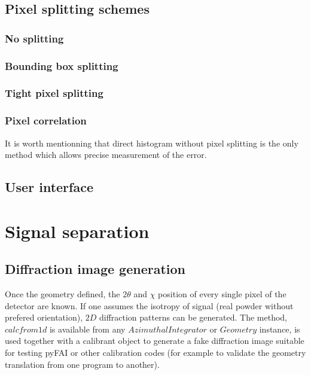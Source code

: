 \documentclass[preprint]{iucr}
\begin{document}
\subsection{Pixel splitting schemes}

\subsubsection{No splitting}

\subsubsection{Bounding box splitting}

\subsubsection{Tight pixel splitting}

\subsubsection{Pixel correlation}

It is worth mentionning that direct histogram without pixel splitting is the
only method which allows precise measurement of the error\cite{billinge2014}.

\subsection{User interface}

\section{Signal separation}

\subsection{Diffraction image generation}

Once the geometry defined, the $2\theta$ and $\chi$ position of every single
pixel of the detector are known.
If one assumes the isotropy of signal (real powder without prefered
orientation), $2D$ diffraction patterns can be generated.
The method, $calcfrom1d$ is available from any $Azimuthal Integrator$ or
$Geometry$ instance, is used together with a calibrant object
to generate a fake diffraction image suitable for testing pyFAI or other 
calibration codes (for example to validate the geometry translation from one
program to another).
\end{document}
